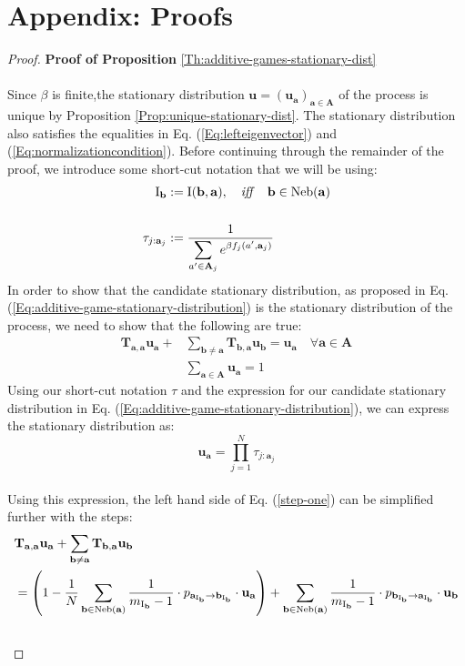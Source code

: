 \documentclass[11pt]{article}
\theoremstyle{plainCl1}
\theoremstyle{plainCl2}
\newcommand{\A}{\mathbf{A}}
\newcommand{\abf}{\mathbf{a}}
\newcommand{\bbf}{\mathbf{b}}
\newcommand{\T}{\mathbf{T}}
\newcommand{\ubf}{\mathbf{u}}
\begin{document}
\section*{Appendix: Proofs}
\label{Section:Appendix}
\begin{proof}
\textbf{Proof of Proposition} \ref{Th:additive-games-stationary-dist} \\ \\ 
Since $\beta$ is finite,the stationary distribution $\ubf = (\ubf_\abf)_{\abf \in \A}$ of the process is unique by Proposition \ref{Prop:unique-stationary-dist}. The stationary distribution also satisfies the equalities in Eq. (\ref{Eq:lefteigenvector}) and (\ref{Eq:normalizationcondition}). Before continuing through the remainder of the proof, we introduce some short-cut notation that we will be using:\\
\begin{align}
\mathrm{I}_{\bbf} &:= \mathrm{I}(\bbf,\abf), \quad \mathit{iff} \quad \bbf \in \mathrm{Neb}(\abf) \\ \notag \\ 
\label{Eq:shortcut-tau}
\tau_{j:\abf_j} &:= \frac{1}{\displaystyle \sum_{a' \in \A_j} e^{\beta f_j(a',  \abf_j)}} 
\end{align}
\noindent In order to show that the candidate stationary distribution, as proposed in Eq. (\ref{Eq:additive-game-stationary-distribution}) is the stationary distribution of the process, we need to show that the following are true:
\begin{align}
\label{step-one}
\T_{\abf,\abf} \ubf_\abf  + &\sum_{\bbf \neq \abf} \T_{\bbf, \abf} \ubf_{\bbf} = \ubf_\abf \quad \forall \abf \in \A \\[10pt]
\label{step-two}
&\sum_{\abf \in \A} \ubf_\abf  = 1
\end{align} 
Using our short-cut notation $\tau$ and the expression for our candidate stationary distribution in Eq. (\ref{Eq:additive-game-stationary-distribution}), we can express the stationary distribution as: 
\begin{equation}
\ubf_\abf = \prod_{j=1}^N \tau_{j:\abf_j}
\label{Eq:additive-stat-shortcut}
\end{equation} \\ 
Using this expression, the left hand side of Eq. (\ref{step-one}) can be simplified further with the steps: 
\begin{align}
&\T_{\abf,\abf} \ubf_\abf  + \sum_{\bbf \neq \abf} \T_{\bbf, \abf} \ubf_{\bbf}\\
&= \left( 1 - \frac{1}{N} \sum_{\bbf \in \mathrm{Neb}(\abf)} \frac{1}{m_{\mathrm{I}_\bbf}-1} \cdot p_{\abf_{\mathrm{I}_\bbf} \to \bbf_{\mathrm{I}_\bbf}} \cdot \ubf_{\abf} \right) + \sum_{\bbf \in \mathrm{Neb}(\abf)}  \frac{1}{m_{\mathrm{I}_\bbf}-1} \cdot p_{\bbf_{\mathrm{I}_\bbf} \to \abf_{\mathrm{I}_\bbf}} \cdot \ubf_{\bbf}\\ \notag \\

\end{align}
\end{proof}
\end{document}
